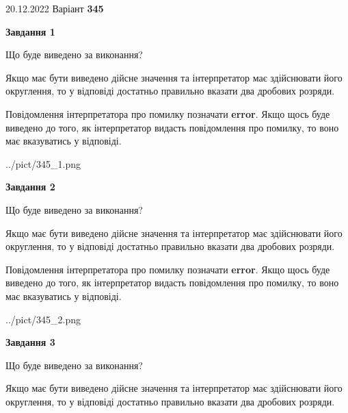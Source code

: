 \documentclass[12pt, ukrainian]{article}
\begin{document}
{20.12.2022 Варіант \No \textbf { 345 }\par}
{
\begin {Large}

{\begin {center}\textbf{Завдання 1}\end {center}}\par
Що буде виведено за виконання? \par

Якщо має бути виведено дійсне значення та інтерпретатор має здійснювати його округлення, 
то у відповіді достатньо правильно вказати два дробових розряди.

Повідомлення інтерпретатора про помилку позначати \textbf{error}.
Якщо щось буде виведено до того, як інтерпретатор видасть повідомлення про помилку, 
то воно має вказуватись у відповіді. \par

\begin{center}
	{../pict/345_1.png}
\end{center}
\newpage

{\begin {center}\textbf{Завдання 2}\end {center}}\par
Що буде виведено за виконання? \par

Якщо має бути виведено дійсне значення та інтерпретатор має здійснювати його округлення, 
то у відповіді достатньо правильно вказати два дробових розряди.

Повідомлення інтерпретатора про помилку позначати \textbf{error}.
Якщо щось буде виведено до того, як інтерпретатор видасть повідомлення про помилку, 
то воно має вказуватись у відповіді. \par

\begin{center}
	{../pict/345_2.png}
\end{center}
\newpage

{\begin {center}\textbf{Завдання 3}\end {center}}\par
Що буде виведено за виконання? \par

Якщо має бути виведено дійсне значення та інтерпретатор має здійснювати його округлення, 
то у відповіді достатньо правильно вказати два дробових розряди.


\end{Large}}
\end{document}
